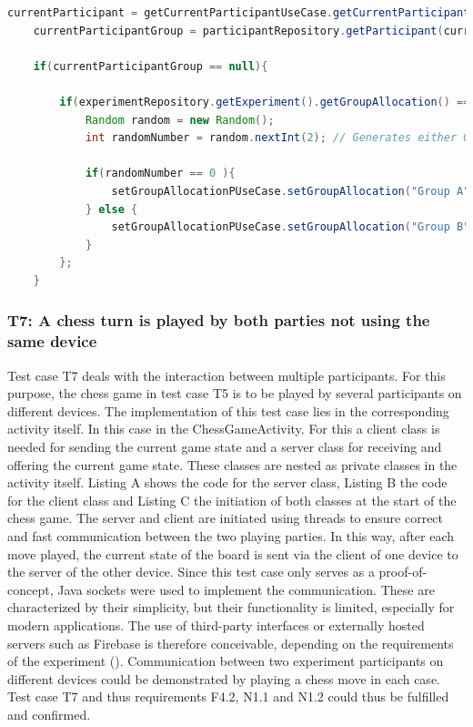 \begin{lstlisting}[language=java,label=t6,lineskip={0pt}, caption=Collect time needed to conduct experiment (b), basicstyle=\scriptsize, captionpos=b]
    currentParticipant = getCurrentParticipantUseCase.getCurrentParticipant();
    currentParticipantGroup = participantRepository.getParticipant(currentParticipant).getGroupAllocation();
    
    if(currentParticipantGroup == null){
    
        if(experimentRepository.getExperiment().getGroupAllocation() == "random"){
            Random random = new Random();
            int randomNumber = random.nextInt(2); // Generates either 0 or 1
    
            if(randomNumber == 0 ){
                setGroupAllocationPUseCase.setGroupAllocation("Group A", currentParticipant);
            } else {
                setGroupAllocationPUseCase.setGroupAllocation("Group B", currentParticipant);
            }
        };
    }
\end{lstlisting}

\newpage\subsubsection*{T7: A chess turn is played by both parties not using the same device}

Test case T7 deals with the interaction between multiple participants. For this purpose, the chess game in test case T5 is to be played by several participants on different devices. The implementation of this test case lies in the corresponding activity itself. In this case in the ChessGameActivity. For this a client class is needed for sending the current game state and a server class for receiving and offering the current game state. These classes are nested as private classes in the activity itself. Listing A shows the code for the server class, Listing B the code for the client class and Listing C the initiation of both classes at the start of the chess game. The server and client are initiated using threads to ensure correct and fast communication between the two playing parties. In this way, after each move played, the current state of the board is sent via the client of one device to the server of the other device. Since this test case only serves as a proof-of-concept, Java sockets were used to implement the communication. These are characterized by their simplicity, but their functionality is limited, especially for modern applications. The use of third-party interfaces or externally hosted servers such as Firebase is therefore conceivable, depending on the requirements of the experiment (\cite{Google.2023b}). Communication between two experiment participants on different devices could be demonstrated by playing a chess move in each case. Test case T7 and thus requirements F4.2, N1.1 and N1.2 could thus be fulfilled and confirmed.

